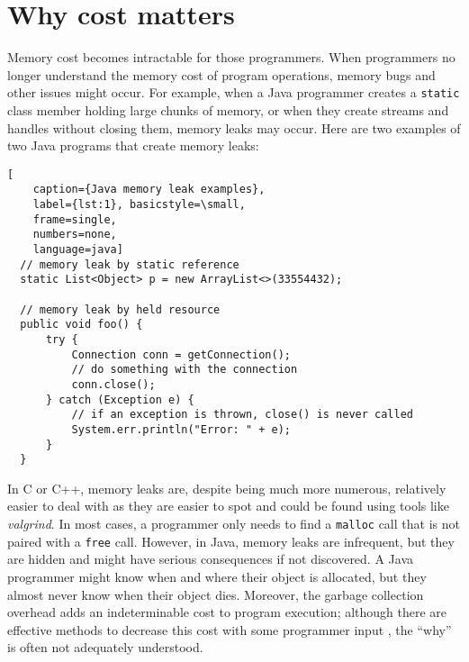 \section{Why cost matters}
Memory cost becomes intractable for those programmers. When programmers no longer understand the memory cost of program operations,
memory bugs and other issues might occur. For example, when a Java programmer creates a \lstinline{static} class member holding large
chunks of memory, or when they create streams and handles without closing them, memory leaks may occur. Here are two examples of
two Java programs that create memory leaks:

\begin{lstlisting}[
    caption={Java memory leak examples},
    label={lst:1}, basicstyle=\small,
    frame=single,
    numbers=none,
    language=java]
  // memory leak by static reference
  static List<Object> p = new ArrayList<>(33554432);
  
  // memory leak by held resource
  public void foo() {
      try {
          Connection conn = getConnection();
          // do something with the connection
          conn.close();
      } catch (Exception e) {
          // if an exception is thrown, close() is never called
          System.err.println("Error: " + e);
      }
  }
\end{lstlisting}

In C or C++, memory leaks are, despite being much more numerous, relatively easier to deal with as they are easier to spot and could
be found using tools like \emph{valgrind}. In most cases, a programmer only needs to find a \lstinline{malloc} call that is not paired
with a \lstinline{free} call. However, in Java, memory leaks are infrequent, but they are hidden and might have serious consequences if
not discovered. A Java programmer might know when and where their object is allocated, but they almost never know when their object dies.
Moreover, the garbage collection overhead adds an indeterminable cost to program execution; although there are effective methods to decrease
this cost with some programmer input \citep{NG2C, PrioritizedGC}, the ``why'' is often not adequately understood.

